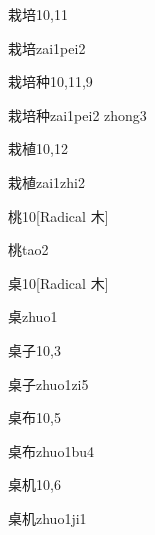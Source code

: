 \begin{entry}{栽培}{10,11}
  \begin{phonetics}{栽培}{zai1pei2}
  \end{phonetics}
\end{entry}

\begin{entry}{栽培种}{10,11,9}
  \begin{phonetics}{栽培种}{zai1pei2 zhong3}
  \end{phonetics}
\end{entry}

\begin{entry}{栽植}{10,12}
  \begin{phonetics}{栽植}{zai1zhi2}
  \end{phonetics}
\end{entry}

\begin{entry}{桃}{10}[Radical 木]
  \begin{phonetics}{桃}{tao2}
  \end{phonetics}
\end{entry}

\begin{entry}{桌}{10}[Radical 木]
  \begin{phonetics}{桌}{zhuo1}
  \end{phonetics}
\end{entry}

\begin{entry}{桌子}{10,3}
  \begin{phonetics}{桌子}{zhuo1zi5}
  \end{phonetics}
\end{entry}

\begin{entry}{桌布}{10,5}
  \begin{phonetics}{桌布}{zhuo1bu4}
  \end{phonetics}
\end{entry}

\begin{entry}{桌机}{10,6}
  \begin{phonetics}{桌机}{zhuo1ji1}
  \end{phonetics}
\end{entry}

